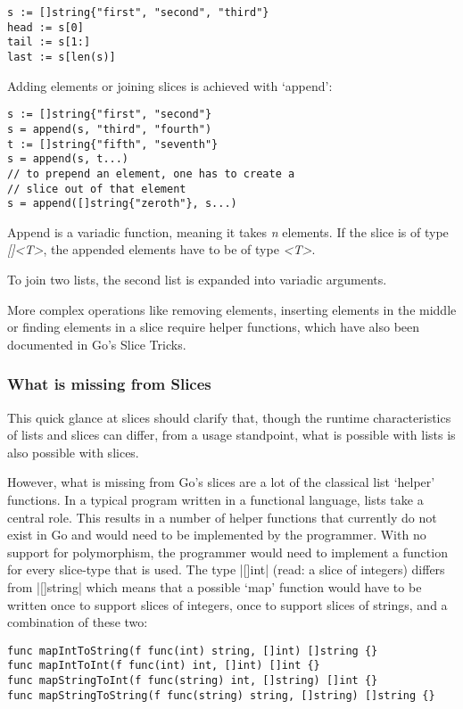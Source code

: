 \begin{verbatim}
s := []string{"first", "second", "third"}
head := s[0]
tail := s[1:]
last := s[len(s)]
\end{verbatim}

Adding elements or joining slices is achieved with `append':

\begin{verbatim}
s := []string{"first", "second"}
s = append(s, "third", "fourth")
t := []string{"fifth", "seventh"}
s = append(s, t...)
// to prepend an element, one has to create a
// slice out of that element
s = append([]string{"zeroth"}, s...)
\end{verbatim}

Append is a variadic function, meaning it takes \textit{n} elements. If the slice is of type \textit{[]<T>},
the appended elements have to be of type \textit{<T>}.

To join two lists, the second list is expanded into
variadic arguments.

More complex operations like removing elements, inserting elements in the middle or finding
elements in a slice require helper functions, which have also been documented in Go's
Slice Tricks\cite{slice-tricks}.

\subsubsection{What is missing from Slices}

This quick glance at slices should clarify that, though the runtime characteristics of lists and slices
can differ, from a usage standpoint, what is possible with lists is also possible with slices.

However, what is missing from Go's slices are a lot of the classical list `helper' functions. In a typical program written in a functional
language, lists take a central role. This results in a number of helper functions\cite{haskell-list-funcs}
that currently do not exist in Go and would need to be implemented by the programmer.
With no support for polymorphism, the programmer would need to implement a function for every slice-type
that is used. The type
|[]int|
(read: a slice of integers) differs from
|[]string|
which means that a possible `map' function would have to be
written once to support slices of integers, once to support slices of strings, and a combination of these two:

\begin{verbatim}
func mapIntToString(f func(int) string, []int) []string {}
func mapIntToInt(f func(int) int, []int) []int {}
func mapStringToInt(f func(string) int, []string) []int {}
func mapStringToString(f func(string) string, []string) []string {}
\end{verbatim}

